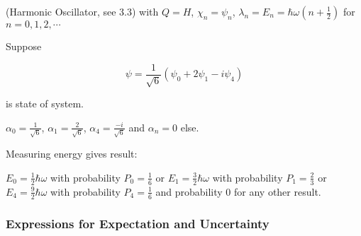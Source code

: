 \documentclass[a4paper]{article}
\begin{document}
\begin{eg}(Harmonic Oscillator, see 3.3)
	with $ Q = H $, $ \chi_{n} = \psi_{n} $, $ \lambda_{n} = E_{n} = \hbar \omega (n + \frac{1}{2}) $ for $ n = 0,1,2,\cdots $
	
	
	Suppose
	
	\[ \psi = \frac{1}{\sqrt{6}}  (\psi_{0} + 2\psi_{1} - i \psi_{4} ) \]
	
	is state of system. 
	
	$ \alpha_{0} = \frac{1}{\sqrt{6}} $, $ \alpha_{1} = \frac{2}{\sqrt{6}} $, $ \alpha_{4} = \frac{-i}{\sqrt{6}} $ and $ \alpha_{n} = 0 $ else.
	
	
	Measuring energy gives result:
	
	$ E_{0} = \frac{1}{2} \hbar \omega $ with probability $ P_{0} = \frac{1}{6} $
	or $ E_{1} = \frac{3}{2} \hbar \omega $ with probability $ P_{1} = \frac{2}{3} $
	or $ E_{4} = \frac{9}{2} \hbar \omega $ with probability $ P_{4} = \frac{1}{6} $ 
	and probability $ 0 $ for any other result.
	
	
	
\end{eg}


\subsubsection{Expressions for Expectation and Uncertainty}
\end{document}
